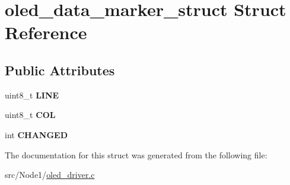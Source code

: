 \hypertarget{structoled__data__marker__struct}{}\section{oled\+\_\+data\+\_\+marker\+\_\+struct Struct Reference}
\label{structoled__data__marker__struct}
\subsection*{Public Attributes}
\begin{DoxyCompactItemize}
\item 
uint8\+\_\+t {\bfseries L\+I\+NE}\hypertarget{structoled__data__marker__struct_a55f2993068e8ec879c0f08df28b87bde}{}\label{structoled__data__marker__struct_a55f2993068e8ec879c0f08df28b87bde}

\item 
uint8\+\_\+t {\bfseries C\+OL}\hypertarget{structoled__data__marker__struct_acad45a7aa1933942a21167ff858d841f}{}\label{structoled__data__marker__struct_acad45a7aa1933942a21167ff858d841f}

\item 
int {\bfseries C\+H\+A\+N\+G\+ED}\hypertarget{structoled__data__marker__struct_a2dc0dab810c7bff97e4fda4637f1ee33}{}\label{structoled__data__marker__struct_a2dc0dab810c7bff97e4fda4637f1ee33}

\end{DoxyCompactItemize}


The documentation for this struct was generated from the following file\+:\begin{DoxyCompactItemize}
\item 
src/\+Node1/\hyperlink{oled__driver_8c}{oled\+\_\+driver.\+c}\end{DoxyCompactItemize}

